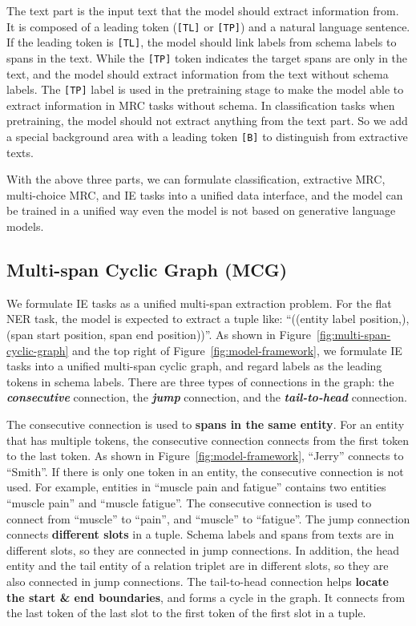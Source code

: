 The text part is the input text that the model should extract information from.
It is composed of a leading token (\verb|[TL]| or \verb|[TP]|) and a natural language sentence.
If the leading token is \verb|[TL]|, the model should link labels from schema labels to spans in the text.
While the \verb|[TP]| token indicates the target spans are only in the text, and the model should extract information from the text without schema labels.
The \verb|[TP]| label is used in the pretraining stage to make the model able to extract information in MRC tasks without schema.
In classification tasks when pretraining, the model should not extract anything from the text part.
So we add a special background area with a leading token \verb|[B]| to distinguish from extractive texts.

With the above three parts, we can formulate classification, extractive MRC, multi-choice MRC, and IE tasks into a unified data interface, and the model can be trained in a unified way even the model is not based on generative language models.

\subsection{Multi-span Cyclic Graph (MCG)}

We formulate IE tasks as a unified multi-span extraction problem.
For the flat NER task, the model is expected to extract a tuple like: ``((entity label position,), (span start position, span end position))''.
As shown in Figure~\ref{fig:multi-span-cyclic-graph} and the top right of Figure~\ref{fig:model-framework}, we formulate IE tasks into a unified multi-span cyclic graph, and regard labels as the leading tokens in schema labels.
There are three types of connections in the graph: the \textbf{\textit{consecutive}} connection, the \textbf{\color[HTML]{695efb} \textit{jump}} connection, and the \textbf{\color[HTML]{E9087F}\textit{tail-to-head}} connection.

The consecutive connection is used to \textbf{spans in the same entity}.
For an entity that has multiple tokens, the consecutive connection connects from the first token to the last token.
As shown in Figure~\ref{fig:model-framework}, ``Jerry'' connects to ``Smith''.
If there is only one token in an entity, the consecutive connection is not used.
For example, entities in ``muscle pain and fatigue'' contains two entities ``muscle pain'' and ``muscle fatigue''.
The consecutive connection is used to connect from ``muscle'' to ``pain'', and ``muscle'' to ``fatigue''.
The jump connection connects \textbf{different slots} in a tuple.
Schema labels and spans from texts are in different slots, so they are connected in jump connections.
In addition, the head entity and the tail entity of a relation triplet are in different slots, so they are also connected in jump connections.
The tail-to-head connection helps \textbf{locate the start \& end boundaries}, and forms a cycle in the graph.
It connects from the last token of the last slot to the first token of the first slot in a tuple.

